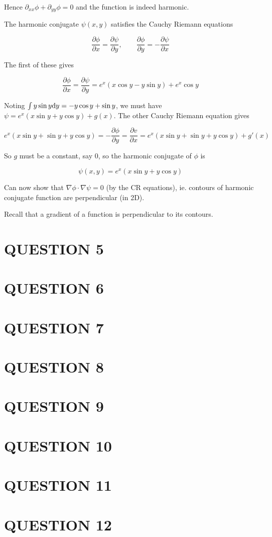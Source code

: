 \documentclass[a4paper]{article}
\begin{document}
Hence $ \partial_{xx} \phi + \partial_{yy} \phi = 0  $ and the function is indeed harmonic.

The harmonic conjugate $ \psi(x,y) $ satisfies the Cauchy Riemann equations

\[ \frac{\partial \phi }{\partial x} = \frac{\partial \psi }{\partial y}, \qquad  \frac{\partial \phi }{\partial y} = - \frac{\partial \psi }{\partial x} \]

The first of these gives 

\[ \frac{\partial \phi }{\partial x} = \frac{\partial \psi }{\partial y} = e^{x}(x \cos y - y \sin y) + e^{x}\cos y \]

Noting $ \int y \sin y \mathrm{d} y = - y \cos y + \sin y $, we must have $ \psi = e^{x}(x \sin y + y \cos y) + g(x) $. The other Cauchy Riemann equation gives

\[ e^{x}(x \sin y + \sin y + y \cos y) = - \frac{\partial \phi }{\partial y} = \frac{\partial v }{\partial x} = e^{x}(x \sin y + \sin y + y \cos y) + g'(x) \]

So $ g $ must be a constant, say $ 0 $, so the harmonic conjugate of $ \phi $ is

\[ \psi(x,y) = e^{x}(x \sin y + y \cos y) \]

Can now show that $ \nabla \phi \cdot \nabla  \psi = 0 $ (by the CR equations), ie. contours of harmonic conjugate function are perpendicular (in 2D). 

Recall that a gradient of a function is perpendicular to its contours. 





\section{QUESTION 5}
\section{QUESTION 6}
\section{QUESTION 7}
\section{QUESTION 8}
\section{QUESTION 9}
\section{QUESTION 10}
\section{QUESTION 11}
\section{QUESTION 12}
\end{document}
